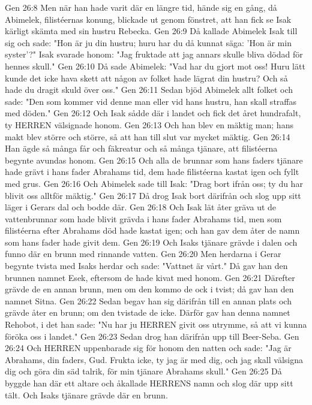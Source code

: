 Gen 26:8  Men när han hade varit där en längre tid, hände sig en gång, då Abimelek, filistéernas konung, blickade ut genom fönstret, att han fick se Isak kärligt skämta med sin hustru Rebecka.
Gen 26:9  Då kallade Abimelek Isak till sig och sade: "Hon är ju din hustru; huru har du då kunnat säga: 'Hon är min syster'?" Isak svarade honom: "Jag fruktade att jag annars skulle bliva dödad för hennes skull."
Gen 26:10  Då sade Abimelek: "Vad har du gjort mot oss! Huru lätt kunde det icke hava skett att någon av folket hade lägrat din hustru? Och så hade du dragit skuld över oss."
Gen 26:11  Sedan bjöd Abimelek allt folket och sade: "Den som kommer vid denne man eller vid hans hustru, han skall straffas med döden."
Gen 26:12  Och Isak sådde där i landet och fick det året hundrafalt, ty HERREN välsignade honom.
Gen 26:13  Och han blev en mäktig man; hans makt blev större och större, så att han till slut var mycket mäktig.
Gen 26:14  Han ägde så många får och fäkreatur och så många tjänare, att filistéerna begynte avundas honom.
Gen 26:15  Och alla de brunnar som hans faders tjänare hade grävt i hans fader Abrahams tid, dem hade filistéerna kastat igen och fyllt med grus.
Gen 26:16  Och Abimelek sade till Isak: "Drag bort ifrån oss; ty du har blivit oss alltför mäktig."
Gen 26:17  Då drog Isak bort därifrån och slog upp sitt läger i Gerars dal och bodde där.
Gen 26:18  Och Isak lät åter gräva ut de vattenbrunnar som hade blivit grävda i hans fader Abrahams tid, men som filistéerna efter Abrahams död hade kastat igen; och han gav dem åter de namn som hans fader hade givit dem.
Gen 26:19  Och Isaks tjänare grävde i dalen och funno där en brunn med rinnande vatten.
Gen 26:20  Men herdarna i Gerar begynte tvista med Isaks herdar och sade: "Vattnet är vårt." Då gav han den brunnen namnet Esek, eftersom de hade kivat med honom.
Gen 26:21  Därefter grävde de en annan brunn, men om den kommo de ock i tvist; då gav han den namnet Sitna.
Gen 26:22  Sedan begav han sig därifrån till en annan plats och grävde åter en brunn; om den tvistade de icke. Därför gav han denna namnet Rehobot, i det han sade: "Nu har ju HERREN givit oss utrymme, så att vi kunna föröka oss i landet."
Gen 26:23  Sedan drog han därifrån upp till Beer-Seba.
Gen 26:24  Och HERREN uppenbarade sig för honom den natten och sade: "Jag är Abrahams, din faders, Gud. Frukta icke, ty jag är med dig, och jag skall välsigna dig och göra din säd talrik, för min tjänare Abrahams skull."
Gen 26:25  Då byggde han där ett altare och åkallade HERRENS namn och slog där upp sitt tält. Och Isaks tjänare grävde där en brunn.
